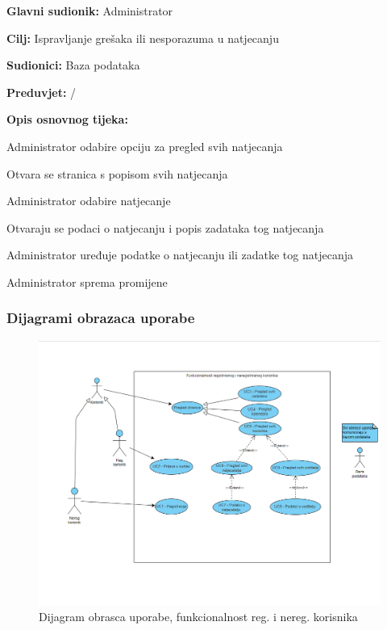 					\noindent {}
						\begin{packed_item}
							
							\item \textbf{Glavni sudionik: } Administrator
							\item  \textbf{Cilj:} Ispravljanje grešaka ili nesporazuma u natjecanju
							\item  \textbf{Sudionici:} Baza podataka
							\item  \textbf{Preduvjet:}  / 
							\item  \textbf{Opis osnovnog tijeka:}
							
							\item[] \begin{packed_enum}
								\item Administrator odabire opciju za pregled svih natjecanja
								\item Otvara se stranica s popisom svih natjecanja
								\item Administrator odabire natjecanje		
								\item Otvaraju se podaci o natjecanju i popis zadataka tog natjecanja
								\item Administrator uređuje podatke o natjecanju ili zadatke tog natjecanja
								\item Administrator sprema promijene
							\end{packed_enum}					
						\end{packed_item}
						
				
					
				\subsubsection{Dijagrami obrazaca uporabe}				
					
						\begin{figure}[H]
						\includegraphics[scale=0.4]{slike/Uml - obrasci uporabe 1}
						\centering
						\caption{Dijagram obrasca uporabe, funkcionalnost reg. i nereg. korisnika}
						\label{fig:dijagram1}
					\end{figure}
					
